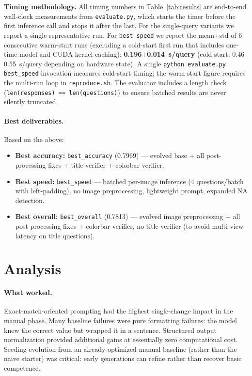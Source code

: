 \documentclass{article}
\begin{document}
\textbf{Timing methodology.}
All timing numbers in Table~\ref{tab:results} are end-to-end wall-clock
measurements from \texttt{evaluate.py}, which starts the timer before the
first inference call and stops it after the last.
For the single-query variants we report a single representative run.
For \texttt{best\_speed} we report the mean$\pm$std of 6 consecutive
warm-start runs (excluding a cold-start first run that includes one-time
model and CUDA-kernel caching): \textbf{0.196$\pm$0.014~s/query}
(cold-start: 0.46--0.55~s/query depending on hardware state).
A single \texttt{python evaluate.py best\_speed} invocation measures
cold-start timing; the warm-start figure requires the multi-run loop in
\texttt{reproduce.sh}.
The evaluator includes a length check
(\texttt{len(responses) == len(questions)}) to ensure batched results are
never silently truncated.

\paragraph{Best deliverables.}
Based on the above:
\begin{itemize}
  \item \textbf{Best accuracy:} \texttt{best\_accuracy} (0.7969) --- evolved
        base + all post-processing fixes + title verifier + colorbar verifier.
  \item \textbf{Best speed:} \texttt{best\_speed} --- batched per-image
        inference (4 questions/batch with left-padding), no image
        preprocessing, lightweight prompt, expanded NA detection.
  \item \textbf{Best overall:} \texttt{best\_overall} (0.7813) --- evolved image
        preprocessing + all post-processing fixes + colorbar verifier, no title
        verifier (to avoid multi-view latency on title questions).
\end{itemize}

\section{Analysis}

\paragraph{What worked.}
Exact-match-oriented prompting had the highest single-change impact in the
manual phase. Many baseline failures were pure formatting failures: the model
knew the correct value but wrapped it in a sentence. Structured output
normalization provided additional gains at essentially zero computational cost.
Seeding evolution from an already-optimized manual baseline (rather than the
naive starter) was critical: early generations can refine rather than recover
basic competence.
\end{document}
